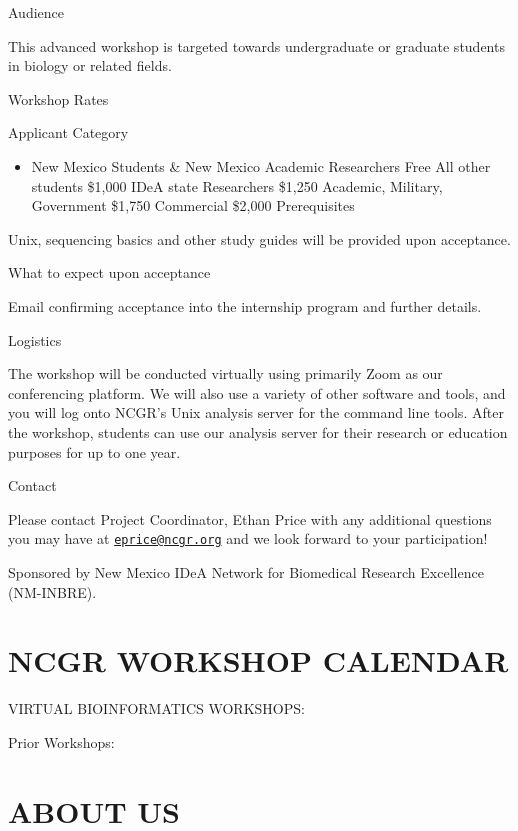 \documentclass[
]{book}
\providecommand{\tightlist}{%
  \setlength{\itemsep}{0pt}\setlength{\parskip}{0pt}}
\begin{document}
Audience

This advanced workshop is targeted towards undergraduate or graduate students in biology or related fields.

\hspace{0pt}

Workshop Rates

Applicant Category

\begin{itemize}
\tightlist
\item
  New Mexico Students \& New Mexico Academic Researchers
  Free
  All other students
  \$1,000
  IDeA state Researchers
  \$1,250
  \hspace{0pt}Academic, Military, Government
  \$1,750
  \hspace{0pt}\hspace{0pt}Commercial
  \$2,000
  Prerequisites
\end{itemize}

Unix, sequencing basics and other study guides will be provided upon acceptance.

What to expect upon acceptance

Email confirming acceptance into the internship program and further details.

Logistics

The workshop will be conducted virtually using primarily Zoom as our conferencing platform. We will also use a variety of other software and tools, and you will log onto NCGR's Unix analysis server for the command line tools. After the workshop, students can use our analysis server for their research or education purposes for up to one year.

Contact

Please contact Project Coordinator, Ethan Price with any additional questions you may have at \href{mailto:eprice@ncgr.org}{\nolinkurl{eprice@ncgr.org}} and we look forward to your participation!

Sponsored by New Mexico IDeA Network for Biomedical Research Excellence (NM-INBRE).

\hypertarget{ncgr-workshop-calendar}{%
\chapter{NCGR WORKSHOP CALENDAR}\label{ncgr-workshop-calendar}}

VIRTUAL BIOINFORMATICS WORKSHOPS:

Prior Workshops:

\hypertarget{about-us}{%
\chapter{ABOUT US}\label{about-us}}
\end{document}
